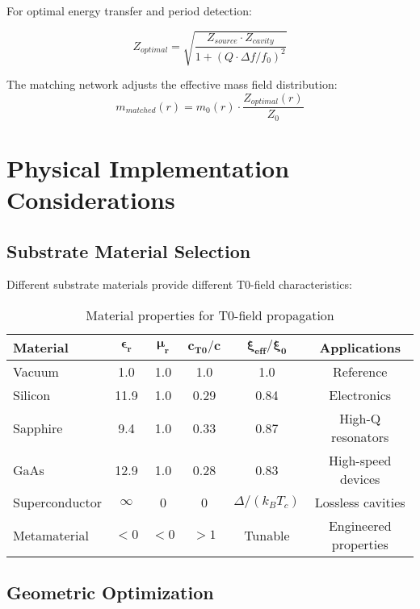 \documentclass[12pt,a4paper]{article}
\begin{document}
	For optimal energy transfer and period detection:
	
	\begin{equation}
		Z_{optimal} = \sqrt{\frac{Z_{source} \cdot Z_{cavity}}{1 + (Q \cdot \Delta f / f_0)^2}}
	\end{equation}
	
	The matching network adjusts the effective mass field distribution:
	\begin{equation}
		m_{matched}(r) = m_0(r) \cdot \frac{Z_{optimal}(r)}{Z_0}
	\end{equation}
	
	\section{Physical Implementation Considerations}
	
	\subsection{Substrate Material Selection}
	
	Different substrate materials provide different T0-field characteristics:
	
	\begin{table}[htbp]
		\centering
		\begin{tabular}{lccccc}
			\toprule
			\textbf{Material} & $\boldsymbol{\epsilon_r}$ & $\boldsymbol{\mu_r}$ & $\boldsymbol{c_{T0}/c}$ & $\boldsymbol{\xi_{eff}/\xi_0}$ & \textbf{Applications} \\
			\midrule
			Vacuum & 1.0 & 1.0 & 1.0 & 1.0 & Reference \\
			Silicon & 11.9 & 1.0 & 0.29 & 0.84 & Electronics \\
			Sapphire & 9.4 & 1.0 & 0.33 & 0.87 & High-Q resonators \\
			GaAs & 12.9 & 1.0 & 0.28 & 0.83 & High-speed devices \\
			Superconductor & $\infty$ & 0 & 0 & $\Delta/(k_B T_c)$ & Lossless cavities \\
			Metamaterial & $< 0$ & $< 0$ & $> 1$ & Tunable & Engineered properties \\
			\bottomrule
		\end{tabular}
		\caption{Material properties for T0-field propagation}
		\label{tab:materials}
	\end{table}
	
	\subsection{Geometric Optimization}
	
\end{document}

